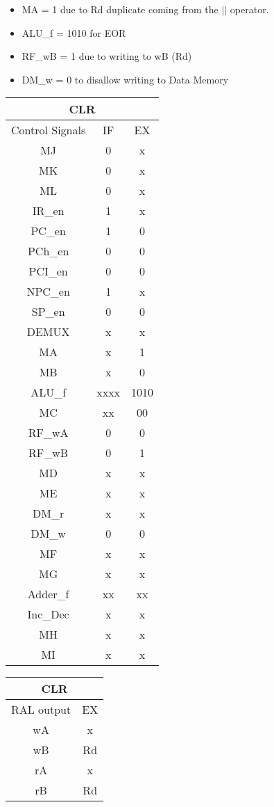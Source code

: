 \documentclass[12pt,letterpaper]{article}
\begin{document}
\begin{enumerate}
		\begin{itemize}
			\item MA = 1 due to Rd duplicate coming from the $||$	 operator.
			\item ALU\_f = 1010 for EOR
			\item RF\_wB = 1 due to writing to wB (Rd)
			\item DM\_w = 0 to disallow writing to Data Memory
		\end{itemize}
   		\begin{tabular}{ |c|c|c| } 
	   		\hline
	   		\multicolumn{3}{|c|}{CLR}\\ \hline
	   		Control Signals & IF & EX \\ \hline
	   		MJ & 0  & x \\ \hline
	   		MK & 0 &  x \\ \hline
	   		ML & 0 &  x \\ \hline
	   		IR\_en& 1 & x \\ \hline
	   		PC\_en & 1 & 0  \\ \hline
	   		PCh\_en & 0 & 0  \\ \hline
	   		PCI\_en  & 0 &  0 \\ \hline
	   		NPC\_en  & 1 &  x \\ \hline
	   		SP\_en  & 0 &  0 \\ \hline
	   		DEMUX  & x &  x \\ \hline
	   		MA  & x &  1 \\ \hline
	   		MB  & x &  0 \\ \hline
	   		ALU\_f  & xxxx & 1010\\ \hline
	   		MC  & xx &  00 \\ \hline
	   		RF\_wA  & 0 &  0 \\ \hline
	   		RF\_wB  & 0 &  1 \\ \hline
	   		MD  & x &  x \\ \hline
	   		ME  & x &  x \\ \hline
	   		DM\_r  & x & x \\ \hline
	   		DM\_w  & 0 &  0 \\ \hline
	   		MF  & x &  x \\ \hline
	   		MG  & x &  x \\ \hline
	   		Adder\_f  & xx &  xx\\ \hline
	   		Inc\_Dec  & x &  x \\ \hline
	   		MH  & x &  x \\ \hline
	   		MI  & x &  x \\ \hline
 		\end{tabular}
	 	\quad
	 	\quad
		\begin{tabular}{ |c|c|} 
			\hline
			\multicolumn{2}{|c|}{CLR}\\ \hline
			RAL output & EX \\ \hline
			wA & x  \\ \hline
			wB &  Rd\\ \hline
			rA &  x \\ \hline
			rB &  Rd\\ \hline
		\end{tabular}
	  

\end{enumerate}
\end{document}

